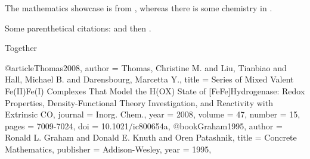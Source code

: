 \documentclass{article}
\begin{document}
	The mathematics showcase is from \citet{Graham1995}, whereas
	there is some chemistry in \citet{Thomas2008}.
	
	Some parenthetical citations: \citep{Graham1995}
	and then \citep[p.~56]{Thomas2008}.
	
	\citep[See][pp.~45--48]{Graham1995}
	
	Together \citep{Graham1995,Thomas2008}
	
	
	
	
	@article{Thomas2008,
		author  = {Thomas, Christine M. and Liu, Tianbiao and Hall, Michael B.
			and Darensbourg, Marcetta Y.},
		title   = {Series of Mixed Valent {Fe(II)Fe(I)} Complexes That Model the
			{H(OX)} State of [{FeFe}]Hydrogenase: Redox Properties,
			Density-Functional Theory Investigation, and Reactivity with
			Extrinsic {CO}},
		journal = {Inorg. Chem.},
		year    = {2008},
		volume  = {47},
		number  = {15},
		pages   = {7009-7024},
		doi     = {10.1021/ic800654a},
	}
	@book{Graham1995,
		author    = {Ronald L. Graham and Donald E. Knuth and Oren Patashnik},
		title     = {Concrete Mathematics},
		publisher = {Addison-Wesley},
		year      = {1995},
	}
\end{document}
